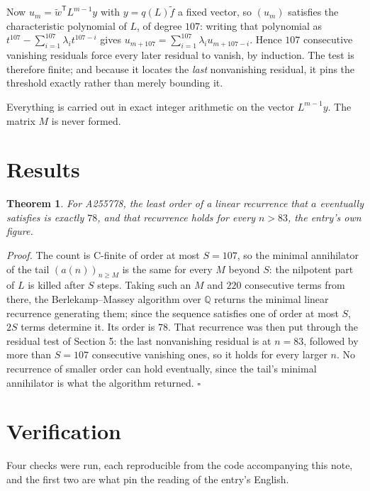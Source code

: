 \documentclass[11pt]{article}
\newtheorem{theorem}{Theorem}
\theoremstyle{definition}
\begin{document}
Now $u_m = \tilde w^{\mathsf T} L^{m-1} y$ with $y = q(L)\tilde f$ a fixed vector, so $(u_m)$ satisfies the characteristic polynomial of $L$, of degree $107$: writing that polynomial as $t^{107} - \sum_{i=1}^{107} \lambda_i t^{107-i}$ gives $u_{m+107} = \sum_{i=1}^{107} \lambda_i u_{m+107-i}$. Hence $107$ consecutive vanishing residuals force every later residual to vanish, by induction. The test is therefore finite; and because it locates the {\itshape last} nonvanishing residual, it pins the threshold exactly rather than merely bounding it.

Everything is carried out in exact integer arithmetic on the vector $L^{m-1}y$. The matrix $M$ is never formed.

\section{Results}

\begin{theorem} For A255778, the least order of a linear recurrence that $a$ eventually satisfies is exactly $78$, and that recurrence holds for every $n > 83$, the entry's own figure.\end{theorem}

{\itshape Proof.} The count is C-finite of order at most $S = 107$, so the minimal annihilator of the tail $(a(n))_{n \ge M}$ is the same for every $M$ beyond $S$: the nilpotent part of $L$ is killed after $S$ steps. Taking such an $M$ and $220$ consecutive terms from there, the Berlekamp--Massey algorithm over $\mathbb{Q}$ returns the minimal linear recurrence generating them; since the sequence satisfies one of order at most $S$, $2S$ terms determine it. Its order is $78$. That recurrence was then put through the residual test of Section 5: the last nonvanishing residual is at $n = 83$, followed by more than $S = 107$ consecutive vanishing ones, so it holds for every larger $n$. No recurrence of smaller order can hold eventually, since the tail's minimal annihilator is what the algorithm returned. $\square$

\section{Verification}

Four checks were run, each reproducible from the code accompanying this note, and the first two are what pin the reading of the entry's English.
\end{document}
